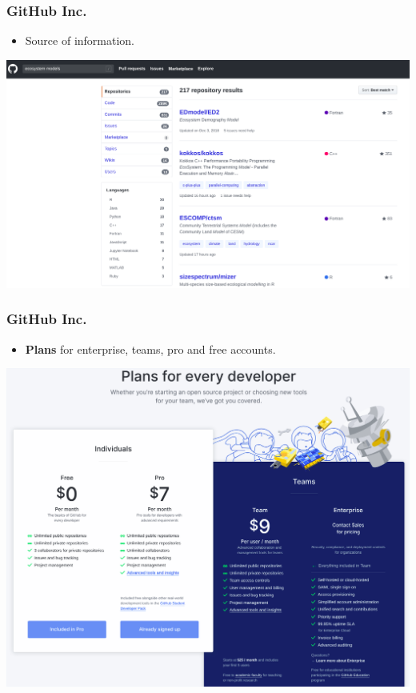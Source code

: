 \documentclass[svgnames]{beamer}
\begin{document}
\begin{frame}
\frametitle{GitHub Inc.}
\begin{itemize}
  \item Source of information.
\end{itemize}
\begin{center}
\includegraphics[scale=0.20]{img/github_projects.png}
\end{center}  

\end{frame}

\begin{frame}
    \frametitle{GitHub Inc.}
    \begin{itemize}
        \item \textbf{Plans} for enterprise, teams, pro and free accounts. \hfill \break
    \end{itemize}

\begin{center}
\includegraphics[scale=0.20]{img/github_plans.png}
\end{center}  


\end{frame}
\end{document}
